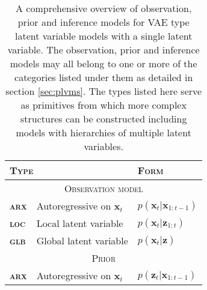 \begin{table}[t!]
\caption{
A comprehensive overview of observation, prior and inference models for VAE type latent variable models with a single latent variable. 
The observation, prior and inference models may all belong to one or more of the categories listed under them as detailed in section \ref{sec:plvms}. 
The types listed here serve as primitives from which more complex structures can be constructed including models with hierarchies of multiple latent variables. 
}
\label{tab:lvm-model-primitives}
\begin{center}
    \begin{tabular}{ l l l } 
        \toprule
        \multicolumn{2}{l}{\textbf{\textsc{Type}}} & \textbf{\textsc{Form}} \\
        \midrule
        \multicolumn{3}{c}{\textsc{Observation model}} \\
        \midrule
        \textbf{\textsc{arx}} & Autoregressive on $\mathbf{x}_t$      & $p(\mathbf{x}_t|\mathbf{x}_{1:t-1})$ \\
        \textbf{\textsc{loc}} & Local latent variable                 & $p(\mathbf{x}_{t}|\mathbf{z}_{1:t})$ \\
        \textbf{\textsc{glb}} & Global latent variable                & $p(\mathbf{x}_{t}|\mathbf{z})$ \\
        \midrule
        \multicolumn{3}{c}{\textsc{Prior}} \\
        \midrule
        \textbf{\textsc{arx}} & Autoregressive on $\mathbf{x}_t$      & $p(\mathbf{z}_t|\mathbf{x}_{1:t-1})$ \\

\end{tabular}
\end{center}
\end{table}
